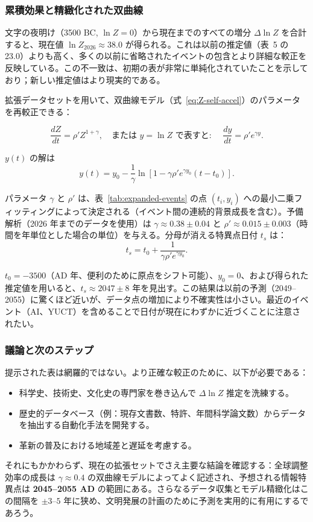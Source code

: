 \documentclass[12pt,a4paper]{article}
\theoremstyle{remark}
\begin{document}
	\subsubsection{累積効果と精緻化された双曲線}
	
	文字の夜明け（3500 BC, \(\ln Z=0\)）から現在までのすべての増分 \(\Delta \ln Z\) を合計すると、現在値 \(\ln Z_{2026} \approx 38.0\) が得られる。これは以前の推定値（表~5 の 23.0）よりも高く、多くの以前に省略されたイベントの包含とより詳細な較正を反映している。この不一致は、初期の表が非常に単純化されていたことを示しており；新しい推定値はより現実的である。
	
	拡張データセットを用いて、双曲線モデル（式~\eqref{eq:Z-self-accel}）のパラメータを再較正できる：
	
	\[
	\frac{dZ}{dt} = \rho' Z^{1+\gamma}, \quad \text{または } y = \ln Z \text{ で表すと: } \quad \frac{dy}{dt} = \rho' e^{\gamma y}.
	\]
	
	\(y(t)\) の解は
	\[
	y(t) = y_0 - \frac{1}{\gamma} \ln\left[1 - \gamma \rho' e^{\gamma y_0} (t - t_0)\right].
	\]
	
	パラメータ \(\gamma\) と \(\rho'\) は、表~\ref{tab:expanded-events} の点 \((t_i, y_i)\) への最小二乗フィッティングによって決定される（イベント間の連続的背景成長を含む）。予備解析（2026 年までのデータを使用）は \(\gamma \approx 0.38 \pm 0.04\) と \(\rho' \approx 0.015 \pm 0.003\)（時間を年単位とした場合の単位）を与える。分母が消える特異点日付 \(t_s\) は：
	\[
	t_s = t_0 + \frac{1}{\gamma \rho' e^{\gamma y_0}}.
	\]
	
	\(t_0 = -3500\)（AD 年、便利のために原点をシフト可能）、\(y_0 = 0\)、および得られた推定値を用いると、\(t_s \approx 2047 \pm 8\) 年を見出す。この結果は以前の予測（2049–2055）に驚くほど近いが、データ点の増加により不確実性は小さい。最近のイベント（AI、YUCT）を含めることで日付が現在にわずかに近づくことに注意されたい。
	
	\subsubsection{議論と次のステップ}
	
	提示された表は網羅的ではない。より正確な較正のために、以下が必要である：
	\begin{itemize}
		\item 科学史、技術史、文化史の専門家を巻き込んで \(\Delta \ln Z\) 推定を洗練する。
		\item 歴史的データベース（例：現存文書数、特許、年間科学論文数）からデータを抽出する自動化手法を開発する。
		\item 革新の普及における地域差と遅延を考慮する。
	\end{itemize}
	それにもかかわらず、現在の拡張セットでさえ主要な結論を確認する：全球調整効率の成長は \(\gamma \approx 0.4\) の双曲線モデルによってよく記述され、予想される情報特異点は \textbf{2045–2055 AD} の範囲にある。さらなるデータ収集とモデル精緻化はこの間隔を \(\pm 3\)–\(5\) 年に狭め、文明発展の計画のために予測を実用的に有用にするであろう。
	
\end{document}
